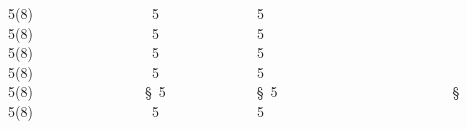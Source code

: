 5(8)                { }5             { }5                         {} 
5(8)                { }5             { }5                         {} 
5(8)                {\cjk{}} 5             {\cjk{}} 5                         {\cjk{}} 
5(8)                {\cjk{}} 5             {\cjk{}} 5                         {\cjk{}} 
5(8)                § 5             § 5                         § 
5(8)                {\cjk{}} 5             {\cjk{}} 5                         {\cjk{}} 

\endgroup{}{}

\endgroup{}\begin{multicols}{2}\end{multicols}
